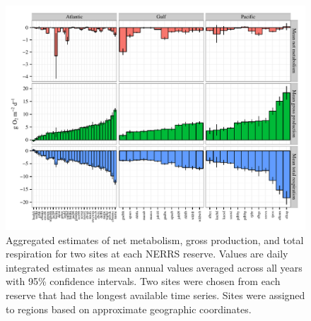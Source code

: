 \documentclass[10pt,letterpaper]{article}\usepackage[]{graphicx}\usepackage[]{color}
\newenvironment{knitrout}{}{} %
\begin{document}
\begin{knitrout}\small
{}\color{fgcolor}\begin{figure}[!ht]


{\centering \includegraphics[width=\textwidth]{figure/metab_plo} 

}

\caption[Aggregated estimates of net metabolism, gross production, and total respiration for two sites at each \ac{NERRS} reserve]{Aggregated estimates of net metabolism, gross production, and total respiration for two sites at each \ac{NERRS} reserve.  Values are daily integrated estimates as mean annual values averaged across all years with 95\% confidence intervals.  Two sites were chosen from each reserve that had the longest available time series. Sites were assigned to regions based on approximate geographic coordinates.\label{fig:metab_plo}}
\end{figure}


\end{knitrout}
\end{document}
